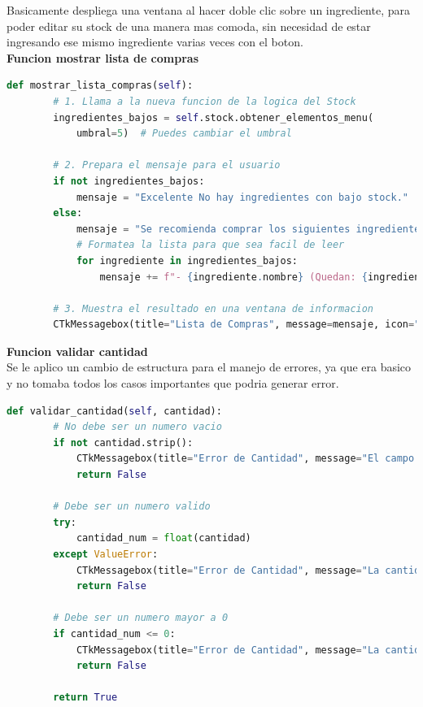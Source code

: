 \documentclass[a4paper,12pt]{article}
\begin{document}
Basicamente despliega una ventana al hacer doble clic sobre un ingrediente, para poder editar su stock de una manera mas comoda, sin necesidad de estar ingresando ese mismo ingrediente varias veces con el boton.\\

\textbf{Funcion mostrar lista de compras}\\

\begin{lstlisting}[language=Python, caption={Nuevo codigo}, frame=single]
    def mostrar_lista_compras(self):
        # 1. Llama a la nueva funcion de la logica del Stock
        ingredientes_bajos = self.stock.obtener_elementos_menu(
            umbral=5)  # Puedes cambiar el umbral

        # 2. Prepara el mensaje para el usuario
        if not ingredientes_bajos:
            mensaje = "Excelente No hay ingredientes con bajo stock."
        else:
            mensaje = "Se recomienda comprar los siguientes ingredientes:\n\n"
            # Formatea la lista para que sea facil de leer
            for ingrediente in ingredientes_bajos:
                mensaje += f"- {ingrediente.nombre} (Quedan: {ingrediente.cantidad})\n"

        # 3. Muestra el resultado en una ventana de informacion
        CTkMessagebox(title="Lista de Compras", message=mensaje, icon="info")
\end{lstlisting}
\textbf{Funcion validar cantidad}\\
Se le aplico un cambio de estructura para el manejo de errores, ya que era basico y no tomaba todos los casos importantes que podria generar error.\\
\newpage
\begin{lstlisting}[language=Python, caption={Cambio de codigo}, frame=single]
    def validar_cantidad(self, cantidad):
        # No debe ser un numero vacio
        if not cantidad.strip():
            CTkMessagebox(title="Error de Cantidad", message="El campo de cantidad no puede estar vacio.", icon="cancel")
            return False

        # Debe ser un numero valido
        try:
            cantidad_num = float(cantidad)
        except ValueError:
            CTkMessagebox(title="Error de Cantidad", message="La cantidad debe ser un numero valido (ej: 10 o 5.5).", icon="cancel")
            return False

        # Debe ser un numero mayor a 0
        if cantidad_num <= 0:
            CTkMessagebox(title="Error de Cantidad", message="La cantidad debe ser un numero mayor que cero.", icon="cancel")
            return False

        return True
\end{lstlisting}
\end{document}
